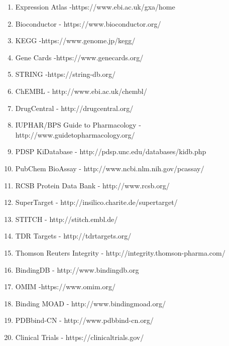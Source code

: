 \begin{enumerate}
	\item Expression Atlas -https://www.ebi.ac.uk/gxa/home
	\item Bioconductor - https://www.bioconductor.org/
	\item KEGG -https://www.genome.jp/kegg/
	\item Gene Cards -https://www.genecards.org/
	\item STRING -https://string-db.org/
	\item ChEMBL - http://www.ebi.ac.uk/chembl/ 
	\item DrugCentral - http://drugcentral.org/ 
	\item IUPHAR/BPS Guide to Pharmacology - http://www.guidetopharmacology.org/ 
	\item PDSP KiDatabase - http://pdsp.unc.edu/databases/kidb.php 
	\item PubChem BioAssay - http://www.ncbi.nlm.nih.gov/pcassay/
	\item RCSB Protein Data Bank - http://www.rcsb.org/ 
	\item SuperTarget - http://insilico.charite.de/supertarget/ 
	\item STITCH - http://stitch.embl.de/ 
	\item TDR Targets - http://tdrtargets.org/ 
	\item Thomson Reuters Integrity - http://integrity.thomson-pharma.com/ 
	\item BindingDB - http://www.bindingdb.org 
	\item OMIM -https://www.omim.org/
	\item Binding MOAD - http://www.bindingmoad.org/ 
	\item PDBbind-CN - http://www.pdbbind-cn.org/ 
	\item Clinical Trials - https://clinicaltrials.gov/
\end{enumerate}
